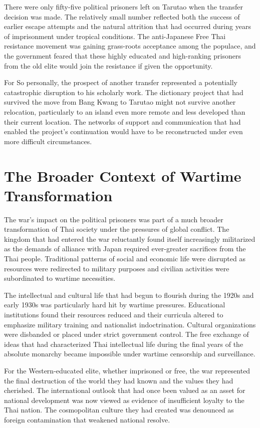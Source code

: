 \documentclass[
  Letterpaper,
]{scrbook}
\begin{document}
There were only fifty-five political prisoners left on Tarutao when the
transfer decision was made. The relatively small number reflected both
the success of earlier escape attempts and the natural attrition that
had occurred during years of imprisonment under tropical conditions. The
anti-Japanese Free Thai resistance movement was gaining grass-roots
acceptance among the populace, and the government feared that these
highly educated and high-ranking prisoners from the old elite would join
the resistance if given the opportunity.

For So personally, the prospect of another transfer represented a
potentially catastrophic disruption to his scholarly work. The
dictionary project that had survived the move from Bang Kwang to Tarutao
might not survive another relocation, particularly to an island even
more remote and less developed than their current location. The networks
of support and communication that had enabled the project's continuation
would have to be reconstructed under even more difficult circumstances.

\section{The Broader Context of Wartime
Transformation}\label{the-broader-context-of-wartime-transformation}

The war's impact on the political prisoners was part of a much broader
transformation of Thai society under the pressures of global conflict.
The kingdom that had entered the war reluctantly found itself
increasingly militarized as the demands of alliance with Japan required
ever-greater sacrifices from the Thai people. Traditional patterns of
social and economic life were disrupted as resources were redirected to
military purposes and civilian activities were subordinated to wartime
necessities.

The intellectual and cultural life that had begun to flourish during the
1920s and early 1930s was particularly hard hit by wartime pressures.
Educational institutions found their resources reduced and their
curricula altered to emphasize military training and nationalist
indoctrination. Cultural organizations were disbanded or placed under
strict government control. The free exchange of ideas that had
characterized Thai intellectual life during the final years of the
absolute monarchy became impossible under wartime censorship and
surveillance.

For the Western-educated elite, whether imprisoned or free, the war
represented the final destruction of the world they had known and the
values they had cherished. The international outlook that had once been
valued as an asset for national development was now viewed as evidence
of insufficient loyalty to the Thai nation. The cosmopolitan culture
they had created was denounced as foreign contamination that weakened
national resolve.
\end{document}
